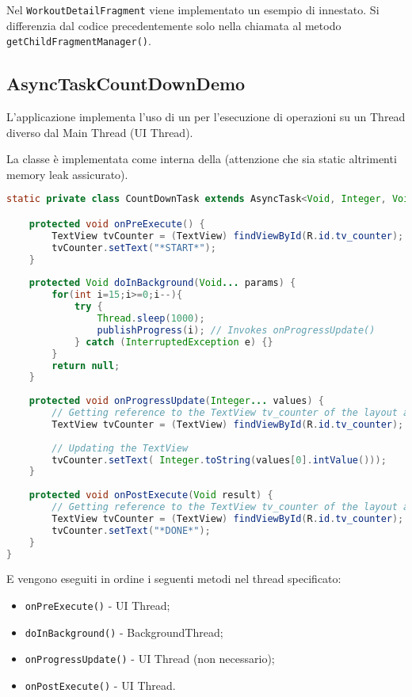 Nel \texttt{WorkoutDetailFragment} viene implementato un esempio di \Fragment innestato. Si differenzia dal codice precedentemente solo nella chiamata al metodo \lstinline|getChildFragmentManager()|.


\subsection{AsyncTaskCountDownDemo}
L'applicazione implementa l'uso di un \AsyncTask per l'esecuzione di operazioni su un Thread diverso dal Main Thread (UI Thread).

La classe è implementata come interna della \MainActivity (attenzione che sia static altrimenti memory leak assicurato).

\begin{lstlisting}[language=Java]
static private class CountDownTask extends AsyncTask<Void, Integer, Void>{

	protected void onPreExecute() {
		TextView tvCounter = (TextView) findViewById(R.id.tv_counter);
		tvCounter.setText("*START*");
	}
	
	protected Void doInBackground(Void... params) {
		for(int i=15;i>=0;i--){
			try {
				Thread.sleep(1000);
				publishProgress(i); // Invokes onProgressUpdate()
			} catch (InterruptedException e) {}
		}
		return null;
	}
	
	protected void onProgressUpdate(Integer... values) {
		// Getting reference to the TextView tv_counter of the layout activity_main
		TextView tvCounter = (TextView) findViewById(R.id.tv_counter);
		
		// Updating the TextView
		tvCounter.setText( Integer.toString(values[0].intValue()));
	}
	
	protected void onPostExecute(Void result) {
		// Getting reference to the TextView tv_counter of the layout activity_main
		TextView tvCounter = (TextView) findViewById(R.id.tv_counter);
		tvCounter.setText("*DONE*");
	}
}
\end{lstlisting}

E vengono eseguiti in ordine i seguenti metodi nel thread specificato:
\begin{itemize}
	\item \texttt{onPreExecute()} - UI Thread;
	\item \texttt{doInBackground()} - BackgroundThread;
	\item \texttt{onProgressUpdate()} - UI Thread (non necessario);
	\item \texttt{onPostExecute()} - UI Thread.
\end{itemize}

